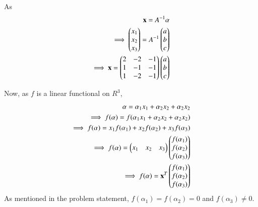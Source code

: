 \documentclass[journal,12pt,twocolumn]{IEEEtran}
\begin{document}
As
\begin{align}
\mathbf{x} = A^{-1} \mathbf{\alpha}\\
\implies \begin{pmatrix}x_1\\x_2\\x_3\end{pmatrix}= A^{-1} \begin{pmatrix}a\\b\\c\end{pmatrix}\\
\implies \mathbf{x}= \begin{pmatrix}2 & -2 & -1\\1 & -1 & -1\\1 & -2 & -1\end{pmatrix} \begin{pmatrix}a\\b\\c\end{pmatrix}
\end{align}

Now, as $f$ is a linear functional on $R^3$,
\begin{align}
\mathbf{\alpha} = \alpha_1 x_1 + \alpha_2 x_2 + \alpha_2 x_2\\
\implies f(\alpha) = f(\alpha_1 x_1 + \alpha_2 x_2 + \alpha_2 x_2)\\
\implies f(\alpha) = x_1 f(\alpha_1) + x_2f(\alpha_2)+ x_3f(\alpha_3)\\
\implies f(\alpha) = \begin{pmatrix}x_1 & x_2 & x_3\end{pmatrix} \begin{pmatrix}f(\alpha_1)\\f(\alpha_2)\\f(\alpha_3)\end{pmatrix}\\
\implies f(\alpha) = \mathbf{x}^T \begin{pmatrix}f(\alpha_1)\\f(\alpha_2)\\f(\alpha_3)\end{pmatrix}
\end{align}
As mentioned in the problem statement, $f(\alpha_1)=f(\alpha_2)=0$ and $f(\alpha_3)\neq 0$.
\end{document}
